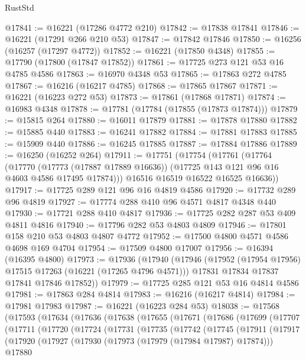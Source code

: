 \begin{lexlean}{RustStd}
\begin{coremodule}
@17841 := @16221 (@17286 @4772 @210)
@17842 := @17838 @17841
@17846 := @16221 (@17291 @266 @210 @53)
@17847 := @17842 @17846
@17850 := @16256 (@16257 (@17297 @4772))
@17852 := @16221 (@17850 @4348)
@17855 := @17790 (@17800 (@17847 @17852))
@17861 := @17725 @273 @121 @53 @16 @4785 @4586
@17863 := @16970 @4348 @53
@17865 := @17863 @272 @4785
@17867 := @16216 (@16217 @4785)
@17868 := @17865 @17867
@17871 := @16221 (@16223 @272 @53)
@17873 := @17861 (@17868 @17871)
@17874 := @16983 @4348
@17878 := @17781 (@17784 (@17855 (@17873 @17874)))
@17879 := @15815 @264
@17880 := @16011 @17879
@17881 := @17878 @17880
@17882 := @15885 @440
@17883 := @16241 @17882
@17884 := @17881 @17883
@17885 := @15909 @440
@17886 := @16245 @17885
@17887 := @17884 @17886
@17889 := @16250 (@16252 @264)
@17911 := @17751
    (@17754
      (@17761
        (@17764
          (@17770
            (@17773 (@17887 @17889 @16636))
            (@17725 @143 @121 @96 @16 @4603 @4586 @17495 @17874)))
        @16516
        @16519
        @16522
        @16525
        @16636))
@17917 := @17725 @289 @121 @96 @16 @4819 @4586
@17920 := @17732 @289 @96 @4819
@17927 := @17774 @288 @410 @96 @4571 @4817 @4348 @440
@17930 := @17721 @288 @410 @4817
@17936 := @17725 @282 @287 @53 @409 @4811 @4816
@17940 := @17796 @282 @53 @4803 @4809
@17946 := @17801 @158 @210 @53 @4803 @4807 @4772
@17952 := @17500 @4800 @4571 @4586 @4698 @169 @4704
@17954 := @17509 @4800 @17007
@17956 := @16394 (@16395 @4800)
@17973 := @17936
    (@17940
      (@17946
        (@17952 (@17954 @17956) @17515 @17263 (@16221 (@17265 @4796 @4571)))
        @17831
        @17834
        @17837
        @17841
        @17846
        @17852))
@17979 := @17725 @285 @121 @53 @16 @4814 @4586
@17981 := @17863 @284 @4814
@17983 := @16216 (@16217 @4814)
@17984 := @17981 @17983
@17987 := @16221 (@16223 @284 @53)
@18038 := @17568
    (@17593
      (@17634
        (@17636
          (@17638
            (@17655
              (@17671
                (@17686
                  (@17699
                    (@17707
                      (@17711
                        (@17720
                          (@17724
                            (@17731
                              (@17735
                                (@17742
                                  (@17745
                                    (@17911
                                      (@17917
                                        (@17920
                                          (@17927
                                            (@17930 (@17973 (@17979 (@17984 @17987) @17874)))
                                            @17880

\end{coremodule}
\end{lexlean}
